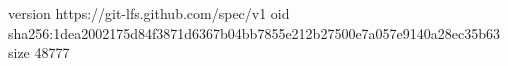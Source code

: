 version https://git-lfs.github.com/spec/v1
oid sha256:1dea2002175d84f3871d6367b04bb7855e212b27500e7a057e9140a28ec35b63
size 48777
